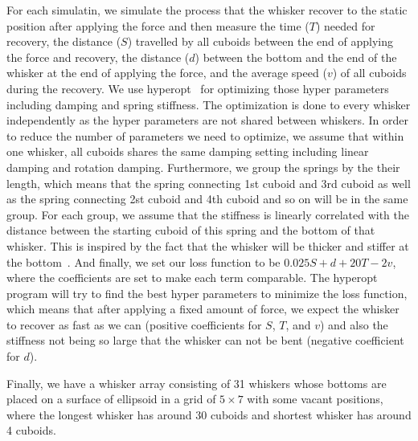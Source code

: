 For each simulatin, we simulate the process that the whisker recover to the static position after applying the force and then measure the time ($T$) needed for recovery, the distance ($S$) travelled by all cuboids between the end of applying the force and recovery, the distance ($d$) between the bottom and the end of the whisker at the end of applying the force, and the average speed ($v$) of all cuboids during the recovery.
We use hyperopt~\cite{bergstra2013hyperopt} for optimizing those hyper parameters including damping and spring stiffness. The optimization is done to every whisker independently as the hyper parameters are not shared between whiskers.
In order to reduce the number of parameters we need to optimize, we assume that within one whisker, all cuboids shares the same damping setting including linear damping and rotation damping.
Furthermore, we group the springs by the their length, which means that the spring connecting 1st cuboid and 3rd cuboid as well as the spring connecting 2st cuboid and 4th cuboid and so on will be in the same group.
For each group, we assume that the stiffness is linearly correlated with the distance between the starting cuboid of this spring and the bottom of that whisker.
This is inspired by the fact that the whisker will be thicker and stiffer at the bottom~\cite{Hartmann:2015}.
And finally, we set our loss function to be $0.025S + d + 20T - 2v$, where the coefficients are set to make each term comparable.
The hyperopt program will try to find the best hyper parameters to minimize the loss function, which means that after applying a fixed amount of force, we expect the whisker to recover as fast as we can (positive coefficients for $S$, $T$, and $v$) and also the stiffness not being so large that the whisker can not be bent (negative coefficient for $d$).

Finally, we have a whisker array consisting of 31 whiskers whose bottoms are placed on a surface of ellipsoid in a grid of $5\times7$ with some vacant positions, where the longest whisker has around 30 cuboids and shortest whisker has around 4 cuboids. 